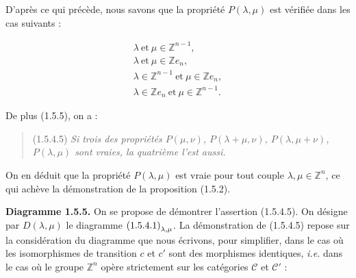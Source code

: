 %
D'après ce qui précède, nous savons que la propriété $P(\lambda,\mu)$
est vérifiée dans les cas suivants :

\begin{equation}
  \begin{gathered}
    \lambda\ \text{et}\ \mu\in\mathbb Z^{n-1},\\
    \lambda\ \text{et}\ \mu\in\mathbb Z e_n,\\
    \lambda\in\mathbb Z^{n-1}\ \text{et}\ \mu\in\mathbb Z e_n,\\
    \lambda\in\mathbb Z e_n\ \text{et}\ \mu\in\mathbb Z^{n-1}.
  \end{gathered}
  \tag{1.5.4.4}
\end{equation}

De plus (1.5.5), on a :

\begin{quote}
  \noindent\textup{(1.5.4.5)}\quad
  \emph{Si trois des propriétés $P(\mu,\nu)$,
  $P(\lambda+\mu,\nu)$, $P(\lambda,\mu+\nu)$, $P(\lambda,\mu)$
  sont vraies, la quatrième l'est aussi.}
\end{quote}

On en déduit que la propriété $P(\lambda,\mu)$ est vraie pour tout
couple $\lambda,\mu\in\mathbb Z^n$, ce qui achève la démonstration de
la proposition (1.5.2).

\noindent\textbf{Diagramme 1.5.5.}\quad
On se propose de démontrer l'assertion (1.5.4.5). On désigne par
$D(\lambda,\mu)$ le diagramme
$\textup{(1.5.4.1)}_{\lambda,\mu}$. La démonstration de (1.5.4.5)
repose sur la considération du diagramme que nous écrivons, pour
simplifier, dans le cas où les isomorphismes de transition $c$ et
$c'$ sont des morphismes identiques, \emph{i.e.} dans le cas où le
groupe $\mathbb Z^n$ opère strictement sur les catégories
$\mathcal C$ et $\mathcal C'$ :

\begin{center}
\end{center}

